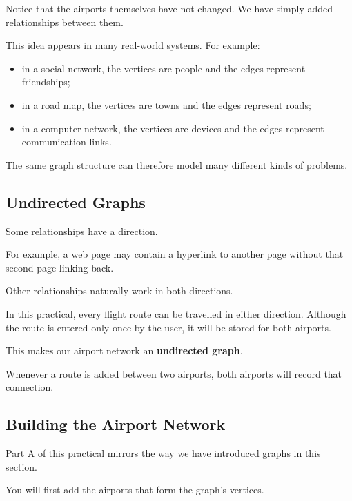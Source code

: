 \documentclass{csc2059practical}
\begin{document}
Notice that the airports themselves have not changed. We have simply added
relationships between them.

This idea appears in many real-world systems.
\clearpage
For example:

\begin{itemize}
\item in a social network, the vertices are people and the edges represent
friendships;
\item in a road map, the vertices are towns and the edges represent roads;
\item in a computer network, the vertices are devices and the edges
represent communication links.
\end{itemize}

The same graph structure can therefore model many different kinds of problems.


\subsection*{Undirected Graphs}

Some relationships have a direction.

For example, a web page may contain a hyperlink to another page without that
second page linking back.

Other relationships naturally work in both directions.

In this practical, every flight route can be travelled in either direction.
Although the route is entered only once by the user, it will be stored for both
airports.

This makes our airport network an \textbf{undirected graph}.

Whenever a route is added between two airports, both airports will record that
connection.



\subsection*{Building the Airport Network}

Part A of this practical mirrors the way we have introduced graphs in this
section.

You will first add the airports that form the graph’s vertices.
\end{document}
